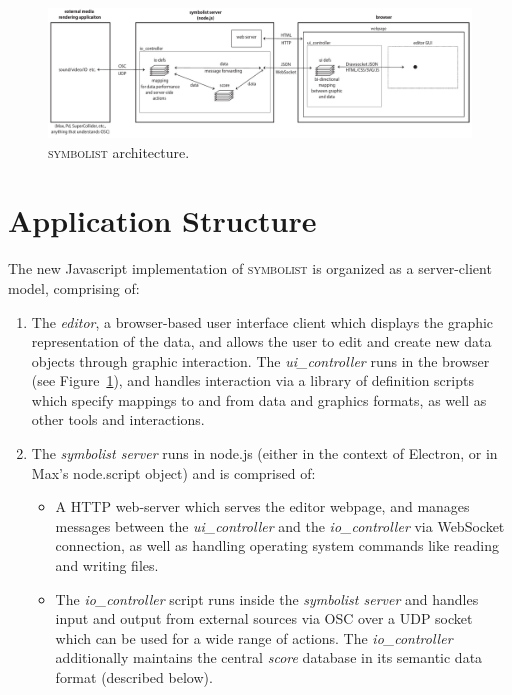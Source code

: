 \documentclass{article}
\def\symbolist{\textsc{symbolist}\xspace}
\def\uicontroller{\textit{ui\_controller}\xspace}
\def\iocontroller{\textit{io\_controller}\xspace}
\begin{document}
\begin{figure}[ht!]
\centering
\includegraphics[width=2\columnwidth]{symbolist-architecture2.pdf}
\caption{ \symbolist architecture.
\label{fig:architecture}}
\end{figure}

\section{Application Structure}\label{sec:application_structure}

The new Javascript implementation of \symbolist is organized as a server-client model, comprising of:

\begin{enumerate}\itemsep0pt 
\item The \textit{editor}, a browser-based user interface client which displays the graphic representation of the data, and allows the user to edit and create new data objects through graphic interaction. The \uicontroller runs in the browser (see Figure~\ref{fig:architecture}), and handles interaction via a library of definition scripts which specify mappings to and from data and graphics formats, as well as other tools and interactions.

\item The \textit{symbolist server} runs in node.js (either in the context of Electron, or in Max's node.script object) and is comprised of: 
\begin{itemize}\itemsep0pt 

\item A HTTP web-server which serves the editor webpage, and manages messages between the \uicontroller and the \iocontroller via WebSocket connection, as well as handling operating system commands like reading and writing files.

\item  The \iocontroller script runs inside the \textit{symbolist server} and handles input and output from external sources via OSC over a UDP socket which can be used for a wide range of actions. The \iocontroller additionally maintains the central \textit{score} database in its semantic data format (described below).
\end{itemize}
\end{enumerate}
\end{document}
